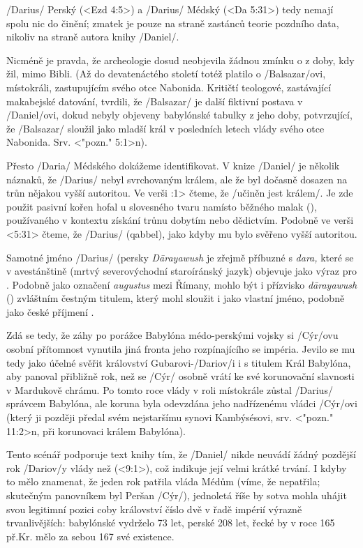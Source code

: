 \enditems

\x/Darius/ Perský (<Ezd 4:5>) a \x/Darius/ Médský (<Da 5:31>) tedy nemají spolu nic do činění; zmatek je pouze na straně zastánců teorie pozdního data, nikoliv na straně autora knihy \x/Daniel/.

Nicméně je pravda, že archeologie dosud neobjevila žádnou zmínku o  z doby, kdy žil, mimo Bibli.
(Až do devatenáctého století totéž platilo o \x/Balsazar/ovi, místokráli, zastupujícím svého otce Nabonida. Kritičtí teologové, zastávající makabejské datování, tvrdili, že
\x/Balsazar/ je další fiktivní postava v \x/Daniel/ovi, dokud nebyly objeveny babylónské tabulky z jeho doby,  potvrzující, že \x/Balsazar/ sloužil jako mladší král v posledních letech vlády svého otce Nabonida. Srv. <"pozn." 5:1>n).

Přesto \x/Daria/ Médského dokážeme identifikovat.
V knize \x/Daniel/ je několik náznaků, že \x/Darius/ nebyl svrchovaným králem, ale že byl dočasně dosazen na trůn nějakou vyšší autoritou.
Ve verši :1> čteme, že \x/učiněn jest králem/. Je zde použit pasivní kořen hofal u slovesného tvaru  namísto běžného malak (), používaného v kontextu získání trůnu dobytím nebo dědictvím.
Podobně ve verši <5:31> čteme, že \x/Darius/  (qabbel), jako kdyby mu bylo svěřeno vyšší autoritou.

Samotné jméno \x/Darius/ (persky {\it D\oldaccents\=arayawush\/} je zřejmě příbuzné s {\it dara,\/} které se v avestánštině (mrtvý severovýchodní staroíránský jazyk) objevuje jako
výraz pro . Podobně jako označení {\it augustus\/} mezi Římany, mohlo být i přízvisko {\it d\oldaccents\=arayawush\/} () zvláštním čestným titulem, který
mohl sloužit i jako vlastní jméno, podobně jako české příjmení .

Zdá se tedy, že záhy po porážce Babylóna médo-perskými vojsky si \x/Cýr/ovu osobní přítomnost vynutila jiná fronta jeho rozpínajícího se impéria. Jevilo se mu tedy jako účelné
svěřit království Gubarovi-\x/Dariov/i i s titulem Král Babylóna, aby panoval přibližně rok, než se \x/Cýr/ osobně vrátí ke své korunovační slavnosti v Mardukově chrámu.
Po tomto roce vlády v roli místokrále zůstal \x/Darius/ správcem Babylóna, ale koruna byla odevzdána jeho nadřízenému vládci \x/Cýr/ovi (který ji později předal svém nejstaršímu synovi Kambýsésovi, srv. <"pozn." 11:2>n, při korunovaci králem Babylóna).

Tento scénář podporuje text knihy tím, že \x/Daniel/ nikde neuvádí žádný pozdější rok \x/Dariov/y vlády než  (<9:1>), což indikuje její velmi krátké trvání.
I kdyby to mělo znamenat, že jeden rok patřila vláda Médům (víme, že nepatřila; skutečným panovníkem byl Peršan \x/Cýr/), jednoletá říše by sotva mohla uhájit svou legitimní
pozici coby království číslo dvě v řadě impérií výrazně trvanlivějších: babylónské vydrželo 73 let, perské 208 let, řecké by v roce 165 př.Kr. mělo za sebou 167 své existence. 

